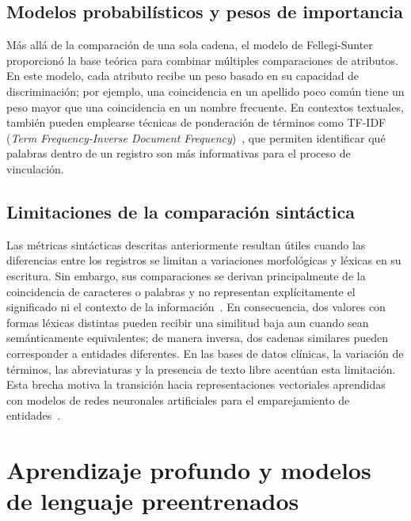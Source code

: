 \subsection{Modelos probabilísticos y pesos de importancia}
Más allá de la comparación de una sola cadena, el modelo de Fellegi-Sunter~\cite{fellegi1969} proporcionó la base teórica para combinar múltiples comparaciones de atributos. En este modelo, cada atributo recibe un peso basado en su capacidad de discriminación; por ejemplo, una coincidencia en un apellido poco común tiene un peso mayor que una coincidencia en un nombre frecuente. En contextos textuales, también pueden emplearse técnicas de ponderación de términos como TF-IDF (\textit{Term Frequency-Inverse Document Frequency})~\cite{salton1988}, que permiten identificar qué palabras dentro de un registro son más informativas para el proceso de vinculación.

\subsection{Limitaciones de la comparación sintáctica}
Las métricas sintácticas descritas anteriormente resultan útiles cuando las diferencias entre los registros se limitan a variaciones morfológicas y léxicas en su escritura. Sin embargo, sus comparaciones se derivan principalmente de la coincidencia de caracteres o palabras y no representan explícitamente el significado ni el contexto de la información~\cite{christen2012,barlaug2021}. En consecuencia, dos valores con formas léxicas distintas pueden recibir una similitud baja aun cuando sean semánticamente equivalentes; de manera inversa, dos cadenas similares pueden corresponder a entidades diferentes. En las bases de datos clínicas, la variación de términos, las abreviaturas y la presencia de texto libre acentúan esta limitación. Esta brecha motiva la transición hacia representaciones vectoriales aprendidas con modelos de redes neuronales artificiales para el emparejamiento de entidades~\cite{barlaug2021,li2020}.


\section{Aprendizaje profundo y modelos de lenguaje preentrenados}

